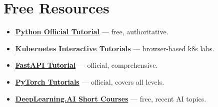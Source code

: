 \documentclass[11pt,a4paper]{article}
\begin{document}
\section{Free Resources}
\begin{itemize}
  \item \href{https://docs.python.org/3/tutorial/}{\textbf{Python Official Tutorial}} — free, authoritative.
  \item \href{https://kubernetes.io/docs/tutorials/}{\textbf{Kubernetes Interactive Tutorials}} — browser-based k8s labs.
  \item \href{https://fastapi.tiangolo.com/tutorial/}{\textbf{FastAPI Tutorial}} — official, comprehensive.
  \item \href{https://pytorch.org/tutorials/}{\textbf{PyTorch Tutorials}} — official, covers all levels.
  \item \href{https://www.deeplearning.ai/short-courses/}{\textbf{DeepLearning.AI Short Courses}} — free, recent AI topics.
\end{itemize}
\end{document}
